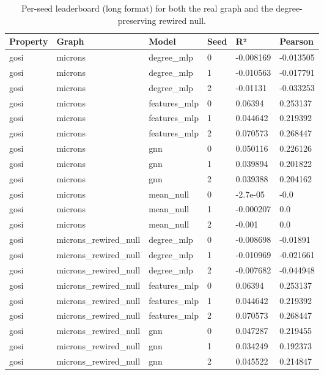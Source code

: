 \begin{table}[htbp]
  \centering
  \caption{Per-seed leaderboard (long format) for both the real graph and the degree-preserving rewired null.}
  \label{tab:perseed}
  \begin{tabular}{llllll}
    \toprule
    Property & Graph & Model & Seed & R² & Pearson \\
    \midrule
    gosi & microns & degree\_mlp & 0 & -0.008169 & -0.013505 \\
    gosi & microns & degree\_mlp & 1 & -0.010563 & -0.017791 \\
    gosi & microns & degree\_mlp & 2 & -0.01131 & -0.033253 \\
    gosi & microns & features\_mlp & 0 & 0.06394 & 0.253137 \\
    gosi & microns & features\_mlp & 1 & 0.044642 & 0.219392 \\
    gosi & microns & features\_mlp & 2 & 0.070573 & 0.268447 \\
    gosi & microns & gnn & 0 & 0.050116 & 0.226126 \\
    gosi & microns & gnn & 1 & 0.039894 & 0.201822 \\
    gosi & microns & gnn & 2 & 0.039388 & 0.204162 \\
    gosi & microns & mean\_null & 0 & -2.7e-05 & -0.0 \\
    gosi & microns & mean\_null & 1 & -0.000207 & 0.0 \\
    gosi & microns & mean\_null & 2 & -0.001 & 0.0 \\
    gosi & microns\_rewired\_null & degree\_mlp & 0 & -0.008698 & -0.01891 \\
    gosi & microns\_rewired\_null & degree\_mlp & 1 & -0.010969 & -0.021661 \\
    gosi & microns\_rewired\_null & degree\_mlp & 2 & -0.007682 & -0.044948 \\
    gosi & microns\_rewired\_null & features\_mlp & 0 & 0.06394 & 0.253137 \\
    gosi & microns\_rewired\_null & features\_mlp & 1 & 0.044642 & 0.219392 \\
    gosi & microns\_rewired\_null & features\_mlp & 2 & 0.070573 & 0.268447 \\
    gosi & microns\_rewired\_null & gnn & 0 & 0.047287 & 0.219455 \\
    gosi & microns\_rewired\_null & gnn & 1 & 0.034249 & 0.192373 \\
    gosi & microns\_rewired\_null & gnn & 2 & 0.045522 & 0.214847 \\

\end{tabular}
\end{table}
